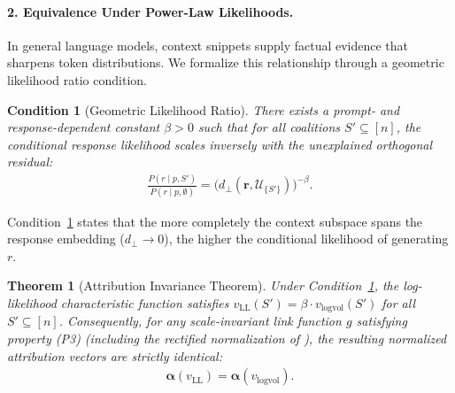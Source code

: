 \documentclass{article}
\newtheorem{theorem}{Theorem}
\newtheorem{condition}{Condition}
\begin{document}
\paragraph{2. Equivalence Under Power-Law Likelihoods.}
In general language models, context snippets supply factual evidence that sharpens token distributions. We formalize this relationship through a geometric likelihood ratio condition.

\begin{condition}[Geometric Likelihood Ratio]\label{cond:geometric_lr}
There exists a prompt- and response-dependent constant $\beta > 0$ such that for all coalitions $S' \subseteq [n]$, the conditional response likelihood scales inversely with the unexplained orthogonal residual:
\begin{align}\label{eq:geometric_lr}
    \frac{P(r \mid p, S')}{P(r \mid p, \emptyset)} = \big(d_{\perp}(\mathbf{r}, \mathcal{U}_{\{S'\}})\big)^{-\beta}.
\end{align}
\end{condition}

Condition~\ref{cond:geometric_lr} states that the more completely the context subspace spans the response embedding ($d_{\perp} \to 0$), the higher the conditional likelihood of generating $r$.

\begin{theorem}[Attribution Invariance Theorem]\label{thm:logvol_llh_equivalence}
Under Condition~\ref{cond:geometric_lr}, the log-likelihood characteristic function satisfies $v_{\text{LL}}(S') = \beta \cdot v_{\text{logvol}}(S')$ for all $S' \subseteq [n]$. Consequently, for any scale-invariant link function $g$ satisfying property (P3) (including the rectified normalization of \cite{nematov2025source}), the resulting normalized attribution vectors are strictly identical:
\begin{align}
    \boldsymbol{\alpha}(v_{\text{LL}}) = \boldsymbol{\alpha}(v_{\text{logvol}}).
\end{align}
\end{theorem}
\end{document}
